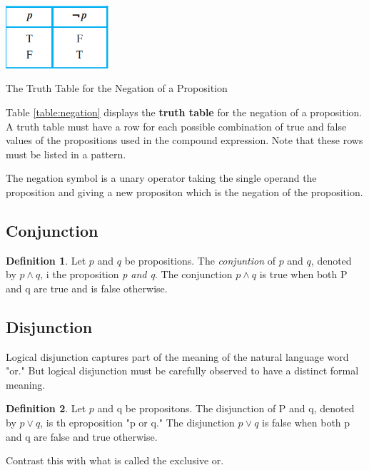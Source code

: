 \documentclass[11pt]{book} %
\theoremstyle {definition}
\newtheorem {definition}{Definition}[section]
\theoremstyle {remark}
\begin{document}
    \begin{table}[htbp]
   \centering
  
   \includegraphics [width=1.5in]{Table-1-1-1-Negation}
   \caption{The Truth Table for the Negation of a Proposition}
   \label{table:negation}
\end{table}
    
    
    
    
    
    Table \ref{table:negation} displays the \textbf{truth table} for the negation of a proposition. A truth table must have a row for each possible combination of true and false values of the propositions used in the compound expression. Note that these rows must be listed in a pattern.

The negation symbol is a unary operator taking the single operand the proposition and giving a new propositon which is the negation of the proposition. 

    \subsection {Conjunction}
\begin {definition} Let $p$ and $q$ be propositions. The \textit{conjuntion} of $p$ and $q$, denoted by $ p \land q$, i the proposition \textit{p and q}. The conjunction $p \land q$ is true when both P and q are true and is false otherwise.
\end {definition}

    \subsection {Disjunction}
Logical disjunction captures part of the meaning of the natural language word "or." But logical disjunction must be carefully observed to have a distinct formal meaning.

\begin {definition}
Let $p$ and q be propositons. The disjunction of P and q, denoted by $p \lor q$, is th eproposition "p or q." The disjunction $p \lor q$ is false when both p and q are false and true otherwise.
\end {definition}

Contrast this with what is called the exclusive or.
\end{document}

